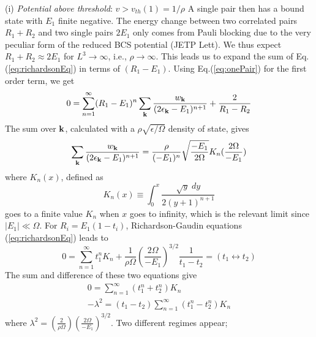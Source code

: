 \documentclass[5p,twocolumn]{elsarticle}
\begin{document}
(i) {\it Potential above threshold}: $v>v_{th}(1)=1/\rho$ A single pair then has a bound state with $E_1$  finite negative. The energy change between two correlated pairs $R_{1}+R_{2}$ and two single pairs  $2E_{1}$ only comes from Pauli blocking due to the very peculiar form of the reduced BCS potential (JETP Lett). We thus expect $R_1+R_2\approx2E_1$ for $L^3\rightarrow\infty$, i.e., $\rho\rightarrow\infty$. This leads us to expand the sum of Eq.(\ref{eq:richardsonEq}) in terms of $(R_{1}-E_{1})$.  Using Eq.(\ref{eq:onePair}) for the first order term, we get
\begin{equation}
0=\sum_{n=1}^{\infty}(R_{1}-E_{1})^{n}\sum_{\mathbf{k}}\frac{w_{\mathbf{k}}}{(2\epsilon_{\mathbf{k}}-E_1)^{n+1}}+\frac{2}{R_1-R_2}
\end{equation}
The sum over $\mathbf{k}$, calculated with a $\rho\sqrt{\epsilon/\Omega}$ density of state, gives
\begin{equation}
\sum_{\mathbf{k}}\frac{w_{\mathbf{k}}}{(2\epsilon_{\mathbf{k}}-E_1)^{n+1}}=\\\frac{\rho}{(-E_{1})^{n}}\sqrt{\frac{-E_{1}}{2\Omega}}K_{n}(\frac{2\Omega}{-E_{1}})
\end{equation}
where $K_{n}(x)$, defined as
\begin{equation}
K_{n}(x)\equiv\int_{0}^{x}\frac{\sqrt{y}\;dy}{2(y+1)^{n+1}}
\end{equation}
goes to a finite value $K_{n}$ when $x$ goes to infinity, which is the relevant limit since $|E_1|\ll\Omega$.
For
$R_{i}=E_{1}(1-t_{i})$, Richardson-Gaudin equations (\ref{eq:richardsonEq}) leads to
\begin{equation}
0=\sum_{n=1}^{\infty}t_{1}^{n}K_{n}+\frac{1}{\rho\Omega}\left(\frac{2\Omega}{-E_{1}}\right)^{3/2}\frac{1}{t_1-t_2}=(t_{1}\leftrightarrow{}t_{2})
\end{equation}
The sum and difference of these two equations give
\begin{gather}
0=\sum_{n=1}^{\infty}(t_{1}^{n}+t_{2}^{n})K_{n}\label{eq:t2}\\
-\lambda^{2}=(t_{1}-t_{2})\sum_{n=1}^{\infty}(t_{1}^{n}-t_{2}^{n})K_{n}\label{eq:t1}
\end{gather}
where $\lambda^2=(\frac{2}{\rho\Omega})(\frac{2\Omega}{-E_{1}})^{3/2}$.
Two different regimes appear; 
\end{document}
